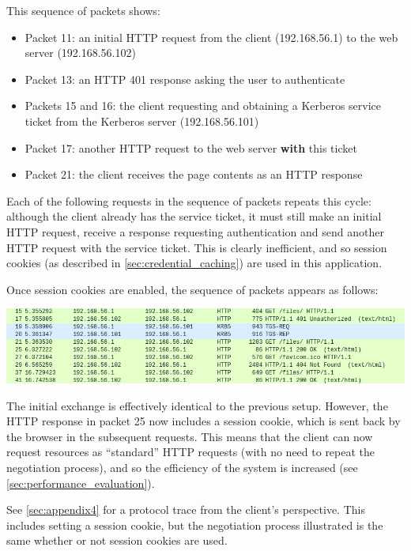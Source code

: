\documentclass[12pt]{report}
\begin{document}
This sequence of packets shows:

\begin{itemize}
\item
  Packet 11: an initial HTTP request from the client (192.168.56.1) to the web server (192.168.56.102)
\item
  Packet 13: an HTTP 401 response asking the user to authenticate
\item
  Packets 15 and 16: the client requesting and obtaining a Kerberos service ticket from the Kerberos server (192.168.56.101)
\item
  Packet 17: another HTTP request to the web server \textbf{with} this ticket
\item
  Packet 21: the client receives the page contents as an HTTP response
\end{itemize}

Each of the following requests in the sequence of packets repeats this cycle: although the client already has the service ticket, it must still make an initial HTTP request, receive a response requesting authentication and send another HTTP request with the service ticket. This is clearly inefficient, and so session cookies (as described in \autoref{sec:credential_caching}) are used in this application.

Once session cookies are enabled, the sequence of packets appears as follows:

\begin{center}
  \includegraphics[width=\textwidth]{10-connect-cookie.png}
\end{center}

The initial exchange is effectively identical to the previous setup. However, the HTTP response in packet 25 now includes a session cookie, which is sent back by the browser in the subsequent requests. This means that the client can now request resources as ``standard'' HTTP requests (with no need to repeat the negotiation process), and so the efficiency of the system is increased (see \autoref{sec:performance_evaluation}).

See \autoref{sec:appendix4} for a protocol trace from the client's perspective. This includes setting a session cookie, but the negotiation process illustrated is the same whether or not session cookies are used.
\end{document}
